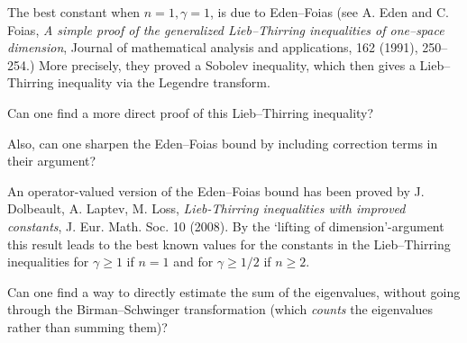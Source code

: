 \documentclass[12pt,letterpaper, reqno]{amsart}
\begin{document}
\begin{problemblock}
 The best constant when $n=1,
\gamma=1$, is due to Eden--Foias
(see A. Eden and C. Foias, \emph{A simple proof of the
generalized Lieb--Thirring inequalities of one--space dimension},
Journal of mathematical analysis and applications, 162 (1991), 250--254.)
More precisely, they proved a Sobolev inequality, which then gives a
Lieb--Thirring inequality via the Legendre transform.

\begin{problem}
Can one find a more direct proof of this Lieb--Thirring
inequality?

Also, can one sharpen the Eden--Foias bound by including correction terms in their argument?
\end{problem}

\begin{remark}
 An operator-valued version of the Eden--Foias bound
has been proved by J. Dolbeault, A. Laptev, M. Loss, \emph{Lieb-Thirring
inequalities with improved constants}, J. Eur. Math. Soc. 10 (2008). By
the `lifting of dimension'-argument this result leads to the best
known values for the constants in the Lieb--Thirring inequalities for
$\gamma\geq 1$ if $n=1$ and for $\gamma\geq 1/2$ if $n\geq 2$.
\end{remark}

\end{problemblock}

\begin{problemblock}


\begin{problem}
 Can one find a way to directly
estimate the sum of the eigenvalues, without going through the
Birman--Schwinger transformation (which \emph{counts} the
eigenvalues rather than summing them)?
\end{problem}
\end{problemblock}
\end{document}
